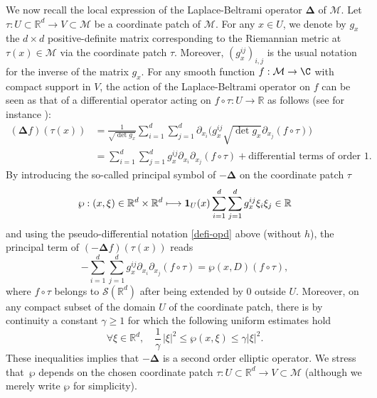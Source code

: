 \documentclass[10pt]{amsart}
\def\mto{\mathchoice{\longmapsto}{\mapsto}{\mapsto}{\mapsto}}
\theoremstyle{theorem}
\theoremstyle{definition}
\newcommand\Deltag{\mathbf{\Delta}}
\newcommand\R{\mathbb{R}}
\newcommand\pun{\mathbf{1}}
\begin{document}
We now recall the local expression of the Laplace-Beltrami operator $\Deltag$ of $\mathcal{M}$.
Let $\tau:U\subset \R^d \to V\subset \mathcal{M}$ be a coordinate patch of $\mathcal{M}$.
For any $x\in U$, we denote by $g_{x}$ the $d\times d$ positive-definite matrix corresponding to the Riemannian metric at $\tau(x)\in \mathcal{M}$ via the coordinate patch $\tau$.
Moreover, $(g_x^{ij})_{i,j}$ is the usual notation for the inverse of the matrix $g_x$.
For any smooth function $f:\mathcal{M}\to \C$ with compact support in $V$, the action of the Laplace-Beltrami operator on $f$ can be seen as that of a differential operator acting on $f\circ \tau:U\to \R$ as follows (see for instance \cite[p.\,167]{shub-pseudo}):
\begin{align*}
(\Deltag f)(\tau(x))& = \frac{1}{\sqrt{\det g_{x}}}\sum_{i=1}^d \sum_{j=1}^d \partial_{x_i} \Big(g_{x}^{ij} \sqrt{\det g_{x}} \partial_{x_j} (f\circ \tau) \Big) \\
& = \sum_{i=1}^d \sum_{j=1}^d g_x^{ij} \partial_{x_i} \partial_{x_j} (f\circ \tau) +\text{differential terms of order }1.
\end{align*}
By introducing the so-called principal symbol of $-\Deltag$ on the coordinate patch $\tau$
\begin{equation}\label{prin-sy}
\wp:(x,\xi)\in \R^d\times \R^d \mto \pun_{U}(x)\sum_{i=1}^d \sum_{j=1}^d g_x^{ij} \xi_i \xi_j\in\R
\end{equation}
and using the pseudo-differential notation \eqref{defi-opd} above (without $h$), the principal term of $(-\Deltag f)(\tau(x))$ reads
\begin{equation*}
-\sum_{i=1}^d \sum_{j=1}^d g_x^{ij}\partial_{x_i} \partial_{x_j} (f\circ \tau) =\wp(x,D)(f\circ\tau),
\end{equation*}
where $f\circ \tau$ belongs to $\mathcal{S}(\R^d)$ after being extended by $0$ outside $U$.
Moreover, on any compact subset of the domain $U$ of the coordinate patch, there is by continuity a constant $\gamma\geq 1$ for which the following uniform estimates hold
\begin{equation}\label{sym-p2}
\forall \xi\in \R^d,\quad \frac{1}{\gamma}\,|\xi|^2\leq \wp(x,\xi)\leq \gamma|\xi|^2.
\end{equation}
These inequalities implies that $-\Deltag$ is a second order elliptic operator.
We stress that~$\wp$ depends on the chosen coordinate patch $\tau:U\subset \R^d\to V\subset \mathcal{M}$ (although we merely write $\wp$ for simplicity).
\end{document}
